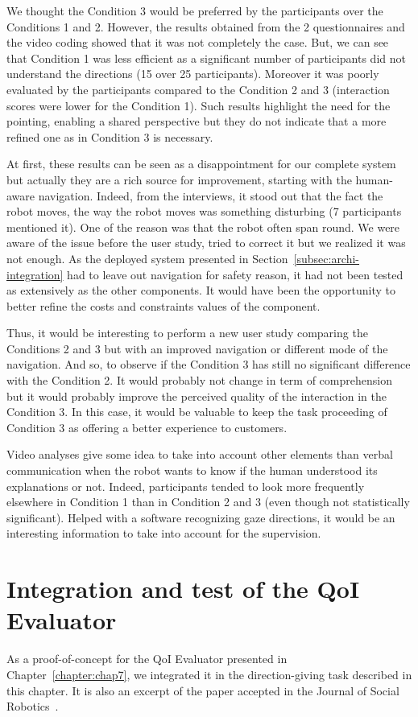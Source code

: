 \documentclass[a4paper,11pt,twoside]{StyleThese}
\begin{document}
We thought the Condition 3 would be preferred by the participants over the Conditions 1 and 2. However, the results obtained from the 2 questionnaires and the video coding showed that it was not completely the case. But, we can see that Condition 1 was less efficient as a significant number of participants did not understand the directions (15 over 25 participants). Moreover it was poorly evaluated by the participants compared to the Condition 2 and 3 (interaction scores were lower for the Condition 1). Such results highlight the need for the pointing, enabling a shared perspective but they do not indicate that a more refined one as in Condition 3 is necessary.

At first, these results can be seen as a disappointment for our complete system but actually they are a rich source for improvement, starting with the human-aware navigation. Indeed, from the interviews, it stood out that the fact the robot moves, the way the robot moves was something disturbing (7 participants mentioned it). One of the reason was that the robot often span round. We were aware of the issue before the user study, tried to correct it but we realized it was not enough. As the deployed system presented in Section~\ref{subsec:archi-integration} had to leave out navigation for safety reason, it had not been tested as extensively as the other components. It would have been the opportunity to better refine the costs and constraints values of the component.

Thus, it would be interesting to perform a new user study comparing the Conditions 2 and 3 but with an improved navigation or different mode of the navigation. And so, to observe if the Condition 3 has still no significant difference with the Condition 2. It would probably not change in term of comprehension but  it would probably improve the perceived quality of the interaction in the Condition 3. In this case, it would be valuable to keep the task proceeding of Condition 3 as offering a better experience to customers.

Video analyses give some idea to take into account other elements than verbal communication when the robot wants to know if the human understood its explanations or not. Indeed, participants tended to look more frequently elsewhere in Condition 1 than in Condition 2 and 3 (even though not statistically significant). Helped with a software recognizing gaze directions, it would be an interesting information to take into account for the supervision.


\section{Integration and test of the QoI Evaluator}\label{sec:qoi_integration}
As a proof-of-concept for the QoI Evaluator presented in Chapter~\ref{chapter:chap7}, we integrated it in the direction-giving task described in this chapter. It is also an excerpt of the paper accepted in the Journal of Social Robotics~\citep{mayima_2021_towards}.
\end{document}
